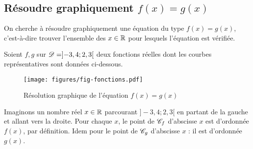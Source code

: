 %
%
%
%
%
\subsection*{Résoudre graphiquement $f(x) = g(x)$}

On cherche à résoudre graphiquement une équation du type $f(x)=g(x)$, c'est-à-dire trouver l'ensemble des $x\in\mathbb{R}$ pour lesquels l'équation est vérifiée.

Soient $f, g$ sur $\mathcal{D} = ]{-}3,4 ; 2,3[$ deux fonctions réelles dont les courbes représentatives sont données ci-dessous.

\begin{figure}[h]
	\begin{center}
	 \texttt{[image: figures/fig-fonctions.pdf]}
	\end{center}
	\caption{Résolution graphique de l'équation $f(x) = g(x)$}
\end{figure}
	
Imaginons un nombre réel $x\in\mathbb{R}$ parcourant $]{-}3,4 ; 2,3[$ en partant de la gauche et allant vers la droite.
Pour chaque $x$, le point de $\mathcal{C}_f$ d'abscisse $x$ est d'ordonnée $f(x)$, par définition.
Idem pour le point de $\mathcal{C}_g$ d'abscisse $x$ : il est d'ordonnée $g(x)$.

